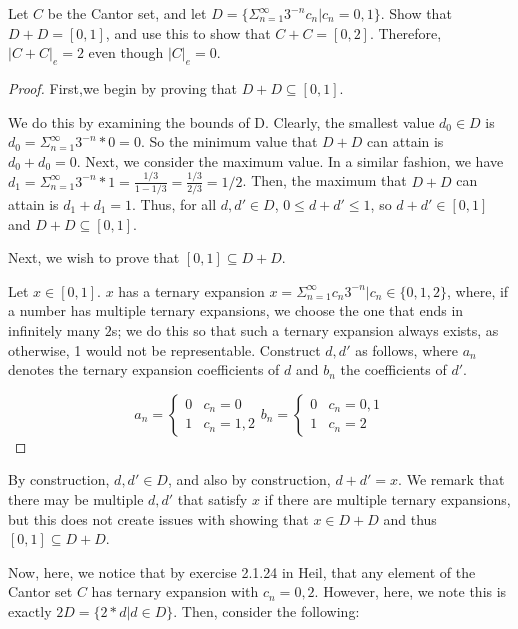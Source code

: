 \documentclass[10pt]{article}
\newenvironment{problem}[2][Problem]{\begin{trivlist}
\item[\hskip \labelsep {\bfseries #1}\hskip \labelsep {\bfseries #2.}]}{\end{trivlist}}
\begin{document}
\begin{problem}{2.1.42}
Let $C$ be the Cantor set, and let $D = \{ \Sigma_{n=1}^\infty 3^{-n} c_n | c_n = 0,1 \}$. Show that $D+D = [0,1]$, and use this to show that $C+C = [0,2]$. Therefore, $|C+C|_e = 2$ even though $|C|_e = 0$.
\end{problem}

\begin{proof}[Proof]
First,we begin by proving that $D+D \subseteq [0,1]$.

We do this by examining the bounds of D. Clearly, the smallest value $d_0 \in D$ is $d_0 = \Sigma_{n=1}^\infty 3^{-n} * 0 = 0$. So the minimum value that $ D + D$ can attain is $d_0 + d_0 = 0$. Next, we consider the maximum value. In a similar fashion, we have $d_1 =  \Sigma_{n=1}^\infty 3^{-n} * 1 = \frac{1/3}{1-1/3} =  \frac{1/3}{2/3} = 1/2$. Then, the maximum that  $D + D$ can attain is $d_1 + d_1 = 1$. Thus, for all $d,d' \in D$, $0 \leq d + d' \leq 1$, so $ d + d' \in [0,1]$ and $D + D \subseteq [0,1]$.

Next, we wish to prove that $[0,1] \subseteq D+D$.

Let $x \in [0,1]$. $x$ has a ternary expansion $x = \Sigma_{n=1}^\infty c_n 3^{-n} | c_n \in \{0,1,2\}$, where, if a number has multiple ternary expansions, we choose the one that ends in infinitely many $2$s; we do this so that such a ternary expansion always exists, as otherwise, 1 would not be representable. Construct $d, d'$ as follows, where $a_n$ denotes the ternary expansion coefficients of $d$ and $b_n$ the coefficients of $d'$.

$$ a_n = \begin{cases}
0 & c_n = 0 \\
1 & c_n = 1,2
\end{cases}
b_n = \begin{cases}
0 & c_n = 0,1 \\
1 & c_n = 2
\end{cases}$$
\end{proof}

By construction, $d, d' \in D$, and also by construction, $d+ d' = x$. We remark that there may be multiple $d, d'$ that satisfy $x$ if there are multiple ternary expansions, but this does not create issues with showing that $x \in D+D$ and thus $[0,1] \subseteq D+D$.

Now, here, we notice that by exercise 2.1.24 in Heil, that any element of the Cantor set $C$ has ternary expansion with $c_n = 0,2$. However, here, we note this is exactly $2D = \{ 2 * d | d \in D \}$. Then, consider the following:
\end{document}
